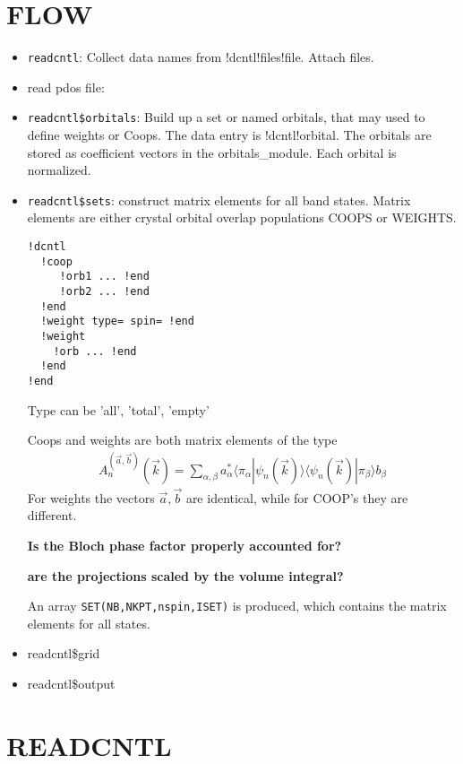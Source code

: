 \documentclass[11pt,a4paper]{report}
\begin{document}
\section{FLOW}
\begin{itemize}
\item \verb|readcntl|: Collect data names from !dcntl!files!file. Attach
  files.
%
\item read pdos file:
%
\item \verb|readcntl$orbitals|: Build up a set or named orbitals, that
  may used to define weights or Coops. The data entry is
  !dcntl!orbital. The orbitals are stored as coefficient vectors in the
  orbitals\_module. Each orbital is normalized.
%
\item \verb|readcntl$sets|: construct matrix elements for all band
  states. Matrix elements are either crystal orbital overlap
  populations COOPS or WEIGHTS.
\begin{verbatim}
!dcntl
  !coop
     !orb1 ... !end
     !orb2 ... !end
  !end
  !weight type= spin= !end
  !weight 
    !orb ... !end
  !end
!end
\end{verbatim}
Type can be 'all', 'total', 'empty'

Coops and weights are both matrix elements of the
  type 
\begin{eqnarray}
A^{(\vec{a},\vec{b})}_{n}(\vec{k})
=\sum_{\alpha,\beta}
a^*_{\alpha}
\langle\pi_\alpha|\psi_n(\vec{k})\rangle
\langle\psi_n(\vec{k})|\pi_\beta\rangle
b_{\beta}
\end{eqnarray}
For weights the vectors $\vec{a},\vec{b}$ are identical, while for
COOP's they are different.

\textbf{Is the Bloch phase factor properly accounted for?}

\textbf{ are the projections scaled by the volume integral?}

An array \verb|SET(NB,NKPT,nspin,ISET)| is produced, which contains
the matrix elements for all states.


\item readcntl\$grid
\item readcntl\$output
\end{itemize}



\section{READCNTL}
\end{document}
